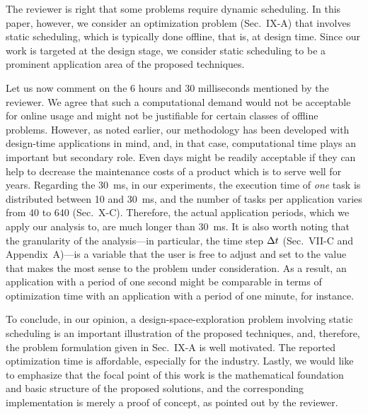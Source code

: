 \begin{authors}
The reviewer is right that some problems require dynamic scheduling. In this
paper, however, we consider an optimization problem (Sec.~IX-A) that involves
static scheduling, which is typically done offline, that is, at design time.
Since our work is targeted at the design stage, we consider static scheduling
to be a prominent application area of the proposed techniques.

Let us now comment on the 6 hours and 30 milliseconds mentioned by the reviewer.
We agree that such a computational demand would not be acceptable for online
usage and might not be justifiable for certain classes of offline problems.
However, as noted earlier, our methodology has been developed with design-time
applications in mind, and, in that case, computational time plays an important
but secondary role. Even days might be readily acceptable if they can help to
decrease the maintenance costs of a product which is to serve well for years.
Regarding the 30~ms, in our experiments, the execution time of \emph{one} task
is distributed between 10 and 30~ms, and the number of tasks per application
varies from 40 to 640 (Sec.~X-C). Therefore, the actual application periods,
which we apply our analysis to, are much longer than 30~ms. It is also worth
noting that the granularity of the analysis---in particular, the time step $\Delta t$
(Sec.~VII-C and Appendix~A)---is a variable that the user is free to adjust and
set to the value that makes the most sense to the problem under consideration.
As a result, an application with a period of one second might be comparable in
terms of optimization time with an application with a period of one minute, for
instance.

To conclude, in our opinion, a design-space-exploration problem involving
static scheduling is an important illustration of the proposed techniques, and,
therefore, the problem formulation given in Sec.~IX-A is well motivated. The
reported optimization time is affordable, especially for the industry. Lastly,
we would like to emphasize that the focal point of this work is the mathematical
foundation and basic structure of the proposed solutions, and the corresponding
implementation is merely a proof of concept, as pointed out by the reviewer.

\begin{actions}
\end{actions}
\end{authors}

